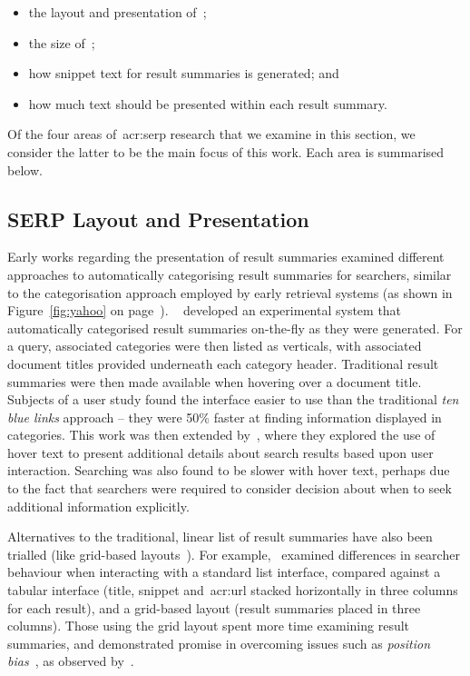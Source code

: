 \begin{itemize}
    \item{the layout and presentation of~;}
    \item{the size of~;}
    \item{how snippet text for result summaries is generated; and}
    \item{how much text should be presented within each result summary}.
\end{itemize}

Of the four areas of~\gls{acr:serp} research that we examine in this section, we consider the latter to be the main focus of this work. Each area is summarised below.

\subsection{SERP Layout and Presentation}
Early works regarding the presentation of result summaries examined different approaches to automatically categorising result summaries for searchers, similar to the categorisation approach employed by early retrieval systems (as shown in Figure~\ref{fig:yahoo} on page~\pageref{fig:yahoo}). ~\cite{chen2000order_to_web} developed an experimental system that automatically categorised result summaries on-the-fly as they were generated. For a query, associated categories were then listed as verticals, with associated document titles provided underneath each category header. Traditional result summaries were then made available when hovering over a document title. Subjects of a user study found the interface easier to use than the traditional \emph{ten blue links} approach -- they were 50\% faster at finding information displayed in categories. This work was then extended by~\cite{dumais2001results_in_context}, where they explored the use of hover text to present additional details about search results based upon user interaction. Searching was also found to be slower with hover text, perhaps due to the fact that searchers were required to consider decision about when to seek additional information explicitly.

Alternatives to the traditional, linear list of result summaries have also been trialled (like grid-based layouts~\citep{resnick2001modeling, kammerer2010interface, chierichetti2011two_dimensional_presentation}). For example,~\cite{kammerer2010interface} examined differences in searcher behaviour when interacting with a standard list interface, compared against a tabular interface (title, snippet and~\gls{acr:url} stacked horizontally in three columns for each result), and a grid-based layout (result summaries placed in three columns). Those using the grid layout spent more time examining result summaries, and demonstrated promise in overcoming issues such as \emph{position bias}~\citep{craswell2008click_models}, as observed by~\cite{joachims2005click_model}.

